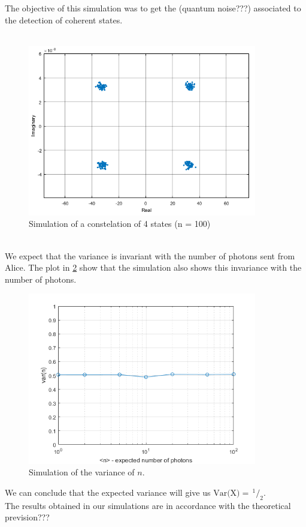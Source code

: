 \documentclass[a4paper]{article}
\newcommand{\slantfrac}[2]{\,^{#1}\!/_{#2}}
\begin{document}
The objective of this simulation was to get the (quantum noise???) associated to the detection of coherent states.\\
\\
\begin{figure}[h]
\centering
\includegraphics[width=10cm]{../img/constelation1.png}
\caption{Simulation of a constelation of 4 states (n = 100)}
\label{fig:constelation}
\end{figure}
\\
We expect that the variance is invariant with the number of photons sent from Alice. The plot in \ref{fig:variance} show that the simulation also shows this invariance with the number of photons.\\
\begin{figure}[H]
\centering
\includegraphics[width=10cm]{../img/variance_n.png}
\caption{Simulation of the variance of $n$.}
\label{fig:variance}
\end{figure}
We can conclude that the expected variance will give us $\textrm{Var(X)} = \slantfrac{1}{2}$.\\
The results obtained in our simulations are in accordance with the theoretical prevision???
\end{document}
